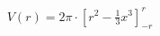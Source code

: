 \documentclass[preview]{standalone}
\begin{document}
\begin{align*}
V\left(r\right)=2\pi\cdot\left[r^{2}-\frac{1}{3}x^{3}\right]_{-r}^{r}
\end{align*}
\end{document}
